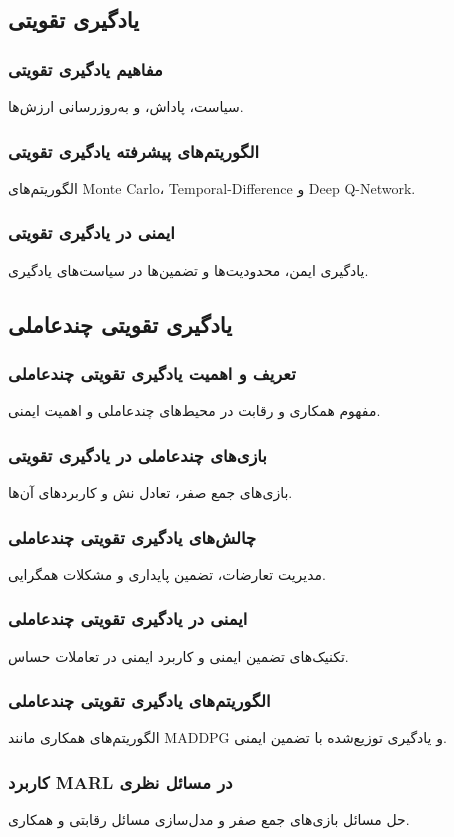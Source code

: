 \subsection{یادگیری تقویتی}
\subsubsection{مفاهیم یادگیری تقویتی}
سیاست، پاداش، و به‌روزرسانی ارزش‌ها.
\subsubsection{الگوریتم‌های پیشرفته یادگیری تقویتی}
الگوریتم‌های Monte Carlo، Temporal-Difference و Deep Q-Network.
\subsubsection{ایمنی در یادگیری تقویتی}
یادگیری ایمن، محدودیت‌ها و تضمین‌ها در سیاست‌های یادگیری.

\subsection{یادگیری تقویتی چندعاملی}
\subsubsection{تعریف و اهمیت یادگیری تقویتی چندعاملی}
مفهوم همکاری و رقابت در محیط‌های چندعاملی و اهمیت ایمنی.
\subsubsection{بازی‌های چندعاملی در یادگیری تقویتی}
بازی‌های جمع صفر، تعادل نش و کاربردهای آن‌ها.
\subsubsection{چالش‌های یادگیری تقویتی چندعاملی}
مدیریت تعارضات، تضمین پایداری و مشکلات همگرایی.
\subsubsection{ایمنی در یادگیری تقویتی چندعاملی}
تکنیک‌های تضمین ایمنی و کاربرد ایمنی در تعاملات حساس.
\subsubsection{الگوریتم‌های یادگیری تقویتی چندعاملی}
الگوریتم‌های همکاری مانند MADDPG و یادگیری توزیع‌شده با تضمین ایمنی.
\subsubsection{کاربرد MARL در مسائل نظری}
حل مسائل بازی‌های جمع صفر و مدل‌سازی مسائل رقابتی و همکاری.
